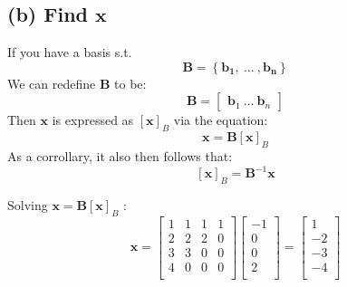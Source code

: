 \documentclass{article}
\begin{document}
\subsection{(b) Find $ \mathbf{x} $} 
If you have a basis s.t.
\[%
    \mathbf{B} = \left\{ \mathbf{b_1}, \ \ldots \ , \mathbf{b_{n}}  \right\}
\]%
We can redefine $ \mathbf{B} $ to be:
\[%
    \mathbf{B} = 
    \begin{bmatrix}
        \mathbf{b}_{1} \ \ldots \ \mathbf{b}_{n}
    \end{bmatrix}
\]%
Then $ \mathbf{x} $ is expressed as $ \left[ \mathbf{x} \right]_{B}  $ via the
equation:
\[%
    \mathbf{x} =  \mathbf{B}\left[ \mathbf{x} \right]_{B}
\]%
As a corrollary, it also then follows that:
\[%
    \left[ \mathbf{x} \right]_{B} = \mathbf{B}^{-1}\mathbf{x}
\]%

Solving $ \mathbf{x} = \mathbf{B} \left[ \mathbf{x} \right]_{B}  $  :
\[%
    \mathbf{x} = 
    \begin{bmatrix}
       1 & 1 & 1 & 1 \\
       2 & 2 & 2 & 0 \\
       3 & 3 & 0 & 0 \\
       4 & 0 & 0 & 0 \\
    \end{bmatrix}
    \begin{bmatrix}
        -1 \\		
        0 \\
		0 \\
		2 \\
    \end{bmatrix}
    =
    \begin{bmatrix}
        1 \\		
        -2 \\
		-3 \\
		-4 \\
    \end{bmatrix}
\]%
\end{document}
